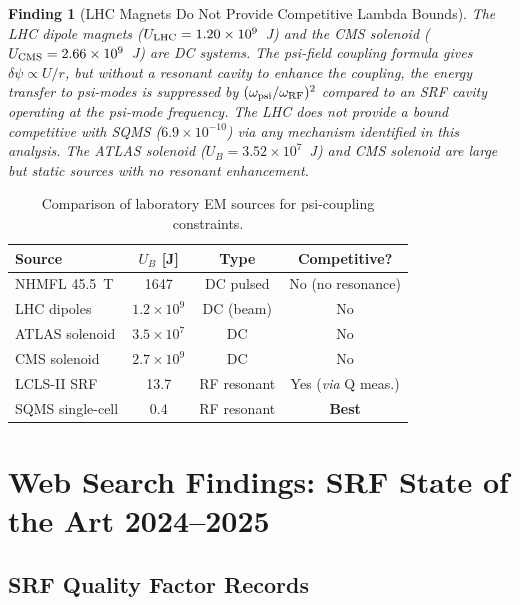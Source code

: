 \documentclass[11pt,twocolumn]{article}
\newcommand{\dpsi}{\delta\psi}
\newtheorem{finding}{Finding}
\begin{document}
\begin{finding}[LHC Magnets Do Not Provide Competitive Lambda Bounds]
\label{find:lhc_bound}
The LHC dipole magnets ($U_{\rm LHC} = 1.20\times10^9$~J) and the CMS solenoid
($U_{\rm CMS} = 2.66\times10^9$~J) are DC systems. The psi-field coupling
formula gives $\dpsi \propto U/r$, but without a resonant cavity to enhance
the coupling, the energy transfer to psi-modes is suppressed by
$(\omega_{\rm psi}/\omega_{\rm RF})^2$ compared to an SRF cavity operating
at the psi-mode frequency. The LHC does not provide a bound competitive with
SQMS ($6.9\times10^{-10}$) via any mechanism identified in this analysis.
The ATLAS solenoid ($U_B = 3.52\times10^7$~J) and CMS solenoid are large
but static sources with no resonant enhancement.
\end{finding}

\begin{table}[h!]
\caption{Comparison of laboratory EM sources for psi-coupling constraints.}
\label{tab:sources}
\begin{tabular}{lccc}
\toprule
Source & $U_B$ [J] & Type & Competitive? \\
\midrule
NHMFL 45.5~T & 1647 & DC pulsed & No (no resonance) \\
LHC dipoles & $1.2\times10^9$ & DC (beam) & No \\
ATLAS solenoid & $3.5\times10^7$ & DC & No \\
CMS solenoid & $2.7\times10^9$ & DC & No \\
LCLS-II SRF & 13.7 & RF resonant & Yes (\emph{via} Q meas.) \\
SQMS single-cell & 0.4 & RF resonant & \textbf{Best} \\
\bottomrule
\end{tabular}
\end{table}


\section{Web Search Findings: SRF State of the Art 2024--2025}
\label{sec:websearch}

\subsection{SRF Quality Factor Records}
\end{document}
